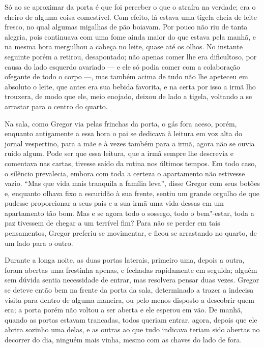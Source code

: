 Só ao se aproximar da porta é que foi perceber o que o atraíra na verdade;
era o cheiro de alguma coisa comestível. Com efeito, lá estava uma tigela
cheia de leite fresco, no qual algumas migalhas de pão boiavam. Por pouco
não riu de tanta alegria, pois continuava com uma fome ainda maior do que
estava pela manhã, e na mesma hora mergulhou a cabeça no leite, quase até
os olhos. No instante seguinte porém a retirou, desapontado; não apenas
comer lhe era dificultoso, por causa do lado esquerdo avariado --- e ele só
podia comer com a colaboração ofegante de todo o corpo ---, mas também
acima de tudo não lhe apeteceu em absoluto o leite, que antes era sua
bebida favorita, e na certa por isso a irmã lho trouxera, de modo que ele,
meio enojado, deixou de lado a tigela, voltando a se arrastar para o
centro do quarto.

Na sala, como Gregor via pelas frinchas da porta, o gás fora aceso, porém,
enquanto antigamente a essa hora o pai se dedicava à leitura em voz alta
do jornal vespertino, para a mãe e à vezes também para a irmã, agora não
se ouvia ruído algum. Pode ser que essa leitura, que a irmã sempre lhe
descrevia e comentava nas cartas, tivesse saído da rotina nos últimos
tempos. Em todo caso, o silêncio prevalecia, embora com toda a certeza o
apartamento não estivesse vazio. “Mas que vida mais tranquila a família
leva”, disse Gregor com seus botões e, enquanto olhava fixo a escuridão à
sua frente, sentiu um grande orgulho de que pudesse proporcionar a seus
pais e a sua irmã uma vida dessas em um apartamento tão bom. Mas e se
agora todo o sossego, todo o bem"-estar, toda a paz tivessem de chegar a um
terrível fim? Para não se perder em tais pensamentos, Gregor preferiu se
movimentar, e ficou se arrastando no quarto, de um lado para o outro.

Durante a longa noite, as duas portas laterais, primeiro uma, depois a
outra, foram abertas uma frestinha apenas, e fechadas rapidamente em
seguida; alguém sem dúvida sentia necessidade de entrar, mas resolvera
pensar duas vezes. Gregor se deteve então bem na frente da porta da sala,
determinado a trazer a indecisa visita para dentro de alguma maneira, ou
pelo menos disposto a descobrir quem era; a porta porém não voltou a ser
aberta e ele esperou em vão. De manhã, quando as portas estavam trancadas,
todos queriam entrar, agora, depois que ele abrira sozinho uma delas, e as
outras ao que tudo indicava teriam sido abertas no decorrer do dia,
ninguém mais vinha, mesmo com as chaves do lado de fora.

